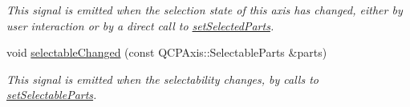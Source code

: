 \begin{DoxyCompactItemize}
\begin{DoxyCompactList}\small\item\em This signal is emitted when the selection state of this axis has changed, either by user interaction or by a direct call to \hyperlink{classQCPAxis_ab9d7a69277dcbed9119b3c1f25ca19c3}{set\+Selected\+Parts}. \end{DoxyCompactList}\item 
\hypertarget{classQCPAxis_aa5ff1fd851139028a3bb4efcb31de9fc}{}void \hyperlink{classQCPAxis_aa5ff1fd851139028a3bb4efcb31de9fc}{selectable\+Changed} (const Q\+C\+P\+Axis\+::\+Selectable\+Parts \&parts)\label{classQCPAxis_aa5ff1fd851139028a3bb4efcb31de9fc}

\begin{DoxyCompactList}\small\item\em This signal is emitted when the selectability changes, by calls to \hyperlink{classQCPAxis_a513f9b9e326c505d9bec54880031b085}{set\+Selectable\+Parts}. \end{DoxyCompactList}\end{DoxyCompactItemize}
